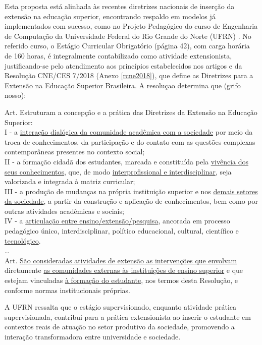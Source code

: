 Esta proposta está alinhada às recentes diretrizes nacionais de inserção da extensão na educação superior, encontrando respaldo em modelos já implementados com sucesso, como no Projeto Pedagógico do curso de Engenharia de Computação da Universidade Federal do Rio Grande do Norte (UFRN) \cite{ufrn2024}. No referido curso, o Estágio Curricular Obrigatório (página 42), com carga horária de 160 horas, é integralmente contabilizado como atividade extensionista, justificando-se pelo atendimento aos princípios estabelecidos nos artigos  e   da Resolução CNE/CES   7/2018 (Anexo \ref{rcne2018}), que define as Diretrizes para a Extensão na Educação Superior Brasileira. A resoluçao determina que (grifo nosso):


\begin{itquotation}
    \noindent%
    Art.  Estruturam a concepção e a prática das Diretrizes da Extensão na Educação
    Superior:\\
    I - a \underline{interação dialógica da comunidade acadêmica com a sociedade} por meio da
    troca de conhecimentos, da participação e do contato com as questões complexas
    contemporâneas presentes no contexto social;\\
    II - a formação cidadã dos estudantes, marcada e constituída pela \underline{vivência dos} \underline{seus
        conhecimentos}, que, de modo \underline{interprofissional e interdisciplinar}, seja
    valorizada e integrada à matriz curricular;\\
    III - a produção de mudanças na própria instituição superior e nos \underline{demais setores} \underline{da
        sociedade}, a partir da construção e aplicação de conhecimentos, bem como por outras
    atividades acadêmicas e sociais;\\
    IV - a \underline{articulação entre ensino/extensão/pesquisa}, ancorada em processo pedagógico
    único, interdisciplinar, político educacional, cultural, científico e \underline{tecnológico}.\\
    \ldots\\
    Art.  \underline{São consideradas atividades de extensão as intervenções que envolvam} diretamente \underline{as comunidades externas às instituições de ensino superior} e que estejam vinculadas \underline{à formação do estudante},
    nos termos desta Resolução, e conforme normas institucionais próprias.
\end{itquotation}

A UFRN ressalta que o estágio supervisionado, enquanto atividade prática supervisionada, contribui para a prática extensionista ao inserir o estudante em contextos reais de atuação no setor produtivo da sociedade, promovendo a interação transformadora entre universidade e sociedade.

